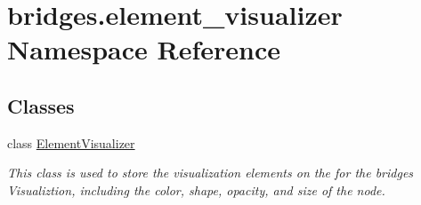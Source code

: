 \hypertarget{namespacebridges_1_1element__visualizer}{}\section{bridges.\+element\+\_\+visualizer Namespace Reference}
\label{namespacebridges_1_1element__visualizer}
\subsection*{Classes}
\begin{DoxyCompactItemize}
\item 
class \hyperlink{classbridges_1_1element__visualizer_1_1_element_visualizer}{Element\+Visualizer}
\begin{DoxyCompactList}\small\item\em This class is used to store the visualization elements on the for the bridges Visualiztion, including the color, shape, opacity, and size of the node. \end{DoxyCompactList}\end{DoxyCompactItemize}
